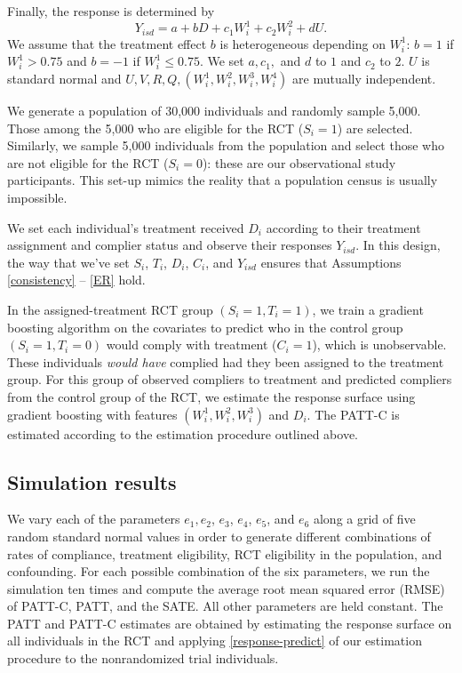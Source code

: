 \documentclass[hidelinks,12pt]{article}
\begin{document}
{Finally, the response is determined by 
\vskip 0.2in
$$Y_{isd} = a + bD + c_1W^{1}_i + c_2W^{2}_i + dU.$$
\vskip 0.2in
We assume that the treatment effect $b$ is heterogeneous depending on $W^{1}_i$: $b = 1$ if $W^{1}_i > 0.75$ and $b=-1$ if $W^{1}_i \leq 0.75$.  We set $a, c_1,$ and $d$ to $1$ and $c_2$ to $2$. $U$ is standard normal and $U, V, R, Q, (W^{1}_i, W^{2}_i, W^{3}_i, W^{4}_i)$ are mutually independent.
 
We generate a population of 30,000 individuals and randomly sample 5,000. Those among the 5,000 who are eligible for the RCT ($S_i=1$) are selected. Similarly, we sample 5,000 individuals from the population and select those who are not eligible for the RCT ($S_i=0$): these are our observational study participants. This set-up mimics the reality that a population census is usually impossible.

We set each individual's treatment received $D_i$ according to their treatment assignment and complier status and observe their responses $Y_{isd}$. In this design, the way that we've set $S_i$, $T_i$, $D_i$, $C_i$, and $Y_{isd}$ ensures that Assumptions \ref{consistency} -- \ref{ER} hold.

{\color{red}
In the assigned-treatment RCT group $(S_i = 1, T_i = 1)$, we train a gradient boosting algorithm \citep{friedman2001greedy} on the covariates to predict who in the control group $(S_i = 1, T_i = 0)$ would comply with treatment ($C_i=1$), which is unobservable.} These individuals \textit{would have} complied had they been assigned to the treatment group. For this group of observed compliers to treatment and predicted compliers from the control group of the RCT, we estimate the response surface {\color{red}using gradient boosting} with features $(W^{1}_i, W^{2}_i, W^{3}_i)$ and $D_i$. The PATT-C is estimated according to the estimation procedure outlined above.

\subsection{Simulation results}\label{sim-results}

{\color{red}We vary each of the parameters $e_1, e_2$, $e_3$, $e_4$, $e_5$, and $e_6$ along a grid of five random standard normal values in order to generate different combinations of rates of compliance, treatment eligibility, RCT eligibility in the population, and confounding. For each possible combination of the six parameters, we run the simulation ten times and compute the average root mean squared error (RMSE) of PATT-C, PATT, and the SATE.} All other parameters are held constant. The PATT and PATT-C estimates are obtained by estimating the response surface on all individuals in the RCT and applying \ref{response-predict} of our estimation procedure to the nonrandomized trial individuals.

}
\end{document}
